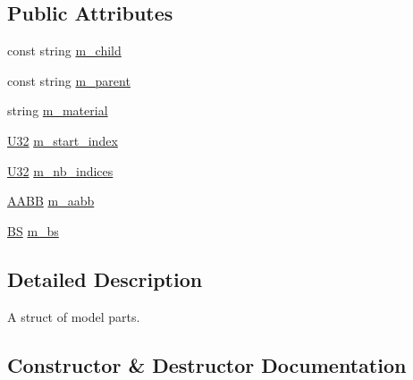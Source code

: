 \subsection*{Public Attributes}
\begin{DoxyCompactItemize}
\item 
const string \hyperlink{structmage_1_1_model_part_ae22f193f0af75fe32f051126163f3fc2}{m\+\_\+child}
\item 
const string \hyperlink{structmage_1_1_model_part_aa76a1a4281c091050fd239eca5dd8ff6}{m\+\_\+parent}
\item 
string \hyperlink{structmage_1_1_model_part_a606603dd01b895cb1aa91b51089bf27f}{m\+\_\+material}
\item 
\hyperlink{namespacemage_a41c104c036fba3756a74e19f793eeaa1}{U32} \hyperlink{structmage_1_1_model_part_a3151ca6c89bad26bc454aca693be97c4}{m\+\_\+start\+\_\+index}
\item 
\hyperlink{namespacemage_a41c104c036fba3756a74e19f793eeaa1}{U32} \hyperlink{structmage_1_1_model_part_ad4be9d829693ccb96bb45fc18aa0ede8}{m\+\_\+nb\+\_\+indices}
\item 
\hyperlink{structmage_1_1_a_a_b_b}{A\+A\+BB} \hyperlink{structmage_1_1_model_part_ab5b4cb74ac7d725896825b0f7ce8472a}{m\+\_\+aabb}
\item 
\hyperlink{structmage_1_1_b_s}{BS} \hyperlink{structmage_1_1_model_part_a551f6c340fa5547364e6cde9720ad856}{m\+\_\+bs}
\end{DoxyCompactItemize}


\subsection{Detailed Description}
A struct of model parts. 

\subsection{Constructor \& Destructor Documentation}
\hypertarget{structmage_1_1_model_part_a3a8eae99c65e242e62786c83abd6a425}{}\label{structmage_1_1_model_part_a3a8eae99c65e242e62786c83abd6a425} 
